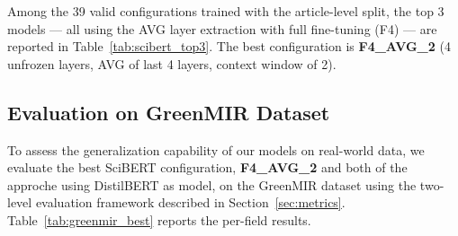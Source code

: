 \documentclass{article}
\theoremstyle{plain}
\theoremstyle{definition}
\theoremstyle{remark}
\begin{document}
Among the 39 valid configurations trained with the article-level split, the top 3 models — all using the AVG layer extraction with full fine-tuning (F4) — are reported in Table~\ref{tab:scibert_top3}. The best configuration is \textbf{F4\_AVG\_2} (4 unfrozen layers, AVG of last 4 layers, context window of 2).

\begin{table}[H]
\centering
{}
\caption{Top 3 SciBERT configurations (article-level split). Test F1 refers to macro F1.}
\label{tab:scibert_top3}
\end{table}

\subsection{Evaluation on GreenMIR Dataset}
To assess the generalization capability of our models on real-world data, we evaluate the best SciBERT configuration, \textbf{F4\_AVG\_2} and both of the approche using DistilBERT as model, on the GreenMIR dataset using the two-level evaluation framework described in Section~\ref{sec:metrics}. Table~\ref{tab:greenmir_best} reports the per-field results.

\begin{table}[H]
\centering
{}
\caption{Categorical metrics of F4\_AVG\_2 on GreenMIR.}
\label{tab:greenmir_cat}
\end{table}
\end{document}
